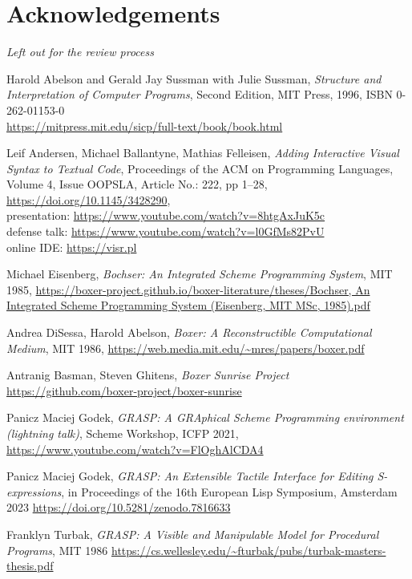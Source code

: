 \documentclass[acmsmall]{acmart}
\begin{document}
\section*{Acknowledgements}

\textit{Left out for the review process}


\begin{thebibliography}{8}

  Harold Abelson and Gerald Jay Sussman with Julie Sussman,
  \emph{Structure and Interpretation of Computer Programs},
  Second Edition, MIT Press, 1996, ISBN 0-262-01153-0 \\
  \url{https://mitpress.mit.edu/sicp/full-text/book/book.html}
  
  Leif Andersen, Michael Ballantyne, Mathias Felleisen,
  \emph{Adding Interactive Visual Syntax to Textual Code},
  Proceedings of the ACM on Programming Languages, Volume 4, Issue OOPSLA,
  Article No.: 222, pp 1–28, \url{https://doi.org/10.1145/3428290}, \\
  presentation: \url{https://www.youtube.com/watch?v=8htgAxJuK5c} \\ 
  defense talk: \url{https://www.youtube.com/watch?v=l0GfMs82PvU} \\
  online IDE: \url{https://visr.pl}

  Michael Eisenberg, \emph{Bochser: An Integrated Scheme Programming System},
  MIT 1985, \url{https://boxer-project.github.io/boxer-literature/theses/Bochser, An Integrated Scheme Programming System (Eisenberg, MIT MSc, 1985).pdf}
  
  Andrea DiSessa, Harold Abelson,
  \emph{Boxer: A Reconstructible Computational Medium},
  MIT 1986, \url{https://web.media.mit.edu/~mres/papers/boxer.pdf}

  Antranig Basman, Steven Ghitens, \emph{Boxer Sunrise Project} \\
  \url{https://github.com/boxer-project/boxer-sunrise}

 Panicz Maciej Godek, \emph{GRASP: A GRAphical
Scheme Programming environment (lightning talk)}, Scheme Workshop,
  ICFP 2021, \url{https://www.youtube.com/watch?v=FlOghAlCDA4}
  
 Panicz Maciej Godek, \emph{GRASP: An Extensible
Tactile Interface for Editing S-expressions}, in Proceedings of the
  16th European Lisp Symposium, Amsterdam 2023
  \url{https://doi.org/10.5281/zenodo.7816633}
  

 Franklyn Turbak, \emph{GRASP: A Visible and
Manipulable Model for Procedural Programs}, MIT 1986
  \url{https://cs.wellesley.edu/~fturbak/pubs/turbak-masters-thesis.pdf}
  
\end{thebibliography}
\end{document}
